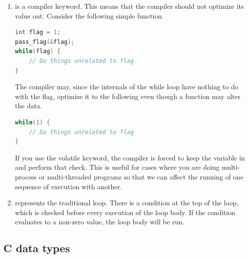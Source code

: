 \begin{enumerate}
	      \begin{lstlisting}[language=C]
void foo(void);
\end{lstlisting}


	      The other use of  is the generic pointer type .
        A  pointer is just a memory address.
         is an incomplete type, meaning that you cannot dereference a , but it can be converted to any other object pointer type without a cast.
        Standard C does not allow pointer arithmetic on a , although gcc and clang permit it as an extension (see the Pointers section).

	      \begin{lstlisting}[language=C]
int *array = void_ptr; // No cast needed
\end{lstlisting}

	    \item {} is a compiler keyword.
        This means that the compiler should not optimize its value out.
        Consider the following simple function.
	      \\
	      \begin{lstlisting}[language=C]
int flag = 1;
pass_flag(&flag);
while(flag) {
    // Do things unrelated to flag
}
\end{lstlisting}
	      The compiler may, since the internals of the while loop have nothing to do with the flag, optimize it to the following even though a function may alter the data.
	      \\
	      \begin{lstlisting}[language=C]
while(1) {
    // Do things unrelated to flag
}
\end{lstlisting}
	      If you use the volatile keyword, the compiler is forced to keep the variable in and perform that check. This is useful for cases where you are doing multi-process or multi-threaded programs so that we can affect the running of one sequence of execution with another.
	\item {} represents the traditional  loop. There is a condition at the top of the loop, which is checked before every execution of the loop body. If the condition evaluates to a non-zero value, the loop body will be run.
\end{enumerate}

\subsection{C data types}

